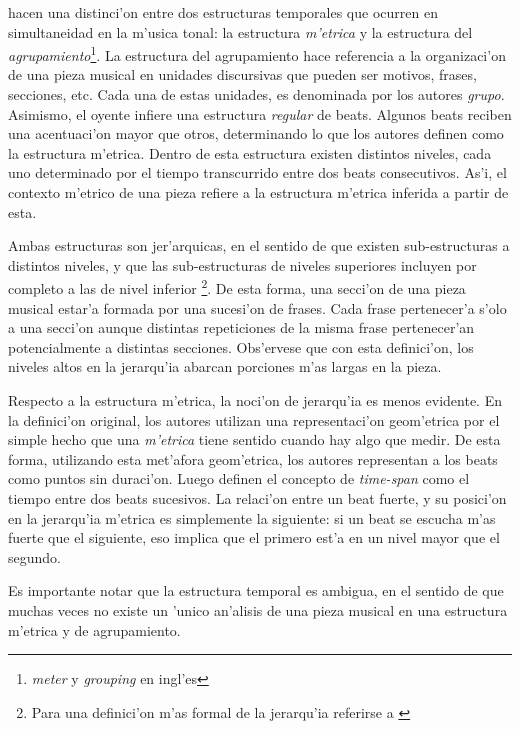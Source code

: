 \citet*{LerdahlJackendoff83} hacen una distinci'on entre dos estructuras temporales que ocurren en simultaneidad en la m'usica tonal:
la estructura \emph{m'etrica} y la estructura del \emph{agrupamiento}\footnote{\emph{meter} y \emph{grouping} en ingl'es}. 
La estructura del agrupamiento hace referencia a la organizaci'on de una pieza musical en unidades discursivas que pueden ser motivos, frases, 
secciones, etc. 
Cada una de estas unidades, es denominada por los autores \emph{grupo}. Asimismo, el oyente infiere una estructura \emph{regular} de beats. 
Algunos beats reciben una acentuaci'on mayor que otros, determinando lo que los autores definen como la estructura m'etrica. Dentro de esta estructura
existen distintos niveles, cada uno determinado por el tiempo transcurrido entre dos beats consecutivos. 
As'i, el contexto m'etrico de una pieza refiere a la estructura m'etrica inferida a partir de esta.

Ambas estructuras son jer'arquicas, en el sentido de que existen sub-estructuras a distintos niveles, y que las sub-estructuras de niveles superiores 
incluyen por completo a las de nivel inferior
\footnote{Para una definici'on m'as formal de la jerarqu'ia referirse a \citet[cap. ~2]{LerdahlJackendoff83}}. De esta forma, una secci'on
de una pieza musical estar'a formada por una sucesi'on de frases. Cada frase pertenecer'a s'olo a una secci'on aunque distintas repeticiones de la misma
frase pertenecer'an potencialmente a distintas secciones. Obs'ervese que con esta definici'on, los niveles altos en la jerarqu'ia abarcan 
porciones m'as largas en la pieza. 

Respecto a la estructura m'etrica, la noci'on de jerarqu'ia es menos evidente. En la definici'on original, los autores utilizan una representaci'on geom'etrica
por el simple hecho que una \emph{m'etrica} tiene sentido cuando hay algo que medir. De esta forma, utilizando esta met'afora geom'etrica, los autores representan 
a los beats como puntos sin duraci'on. Luego definen el concepto de \emph{time-span} como el tiempo entre dos beats sucesivos. 
La relaci'on entre un beat fuerte, y su posici'on en la jerarqu'ia m'etrica es simplemente la siguiente: si un beat se escucha m'as fuerte que el siguiente, eso implica
que el primero est'a en un nivel mayor que el segundo.

%
%
%
Es importante notar que la estructura temporal es ambigua, en el sentido de que muchas veces no existe un 'unico an'alisis de una pieza musical 
en una estructura m'etrica y de agrupamiento.


